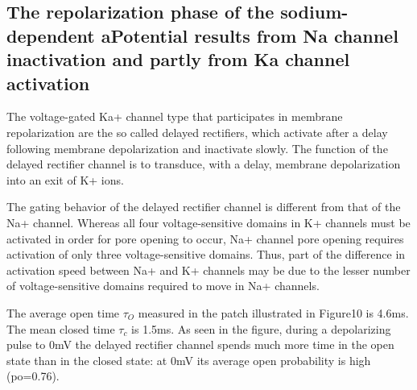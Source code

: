 \documentclass[../../Orator]{subfiles}
\begin{document}
\subsection{The repolarization phase of the sodium-dependent \gls{aPotential} results from  \gls{Na} channel inactivation and partly from  \gls{Ka} channel activation}

The voltage-gated Ka+ channel type that participates in membrane repolarization are the so called delayed rectifiers, which activate after a delay following membrane depolarization and inactivate slowly. The function of the delayed rectifier channel is to transduce, with a delay, membrane depolarization into an exit of K+ ions. 

The gating behavior of the delayed rectifier channel is different from that of the Na+ channel.  Whereas all four voltage-sensitive domains in K+ channels must be activated in order for pore opening to occur, Na+ channel pore opening requires activation of only three voltage-sensitive domains. Thus, part of the difference in activation speed between Na+ and K+ channels may be due to the lesser number of voltage-sensitive domains required to move in Na+ channels.

The average open time \(\tau_O\) measured in the patch illustrated in Figure10 is 4.6ms. The mean closed time \(\tau_c\) is 1.5ms. As seen in the figure, during a depolarizing pulse to 0mV the delayed rectifier channel spends much more time in the open state than in the closed state: at 0mV its average open probability is high (po=0.76).
\end{document}
